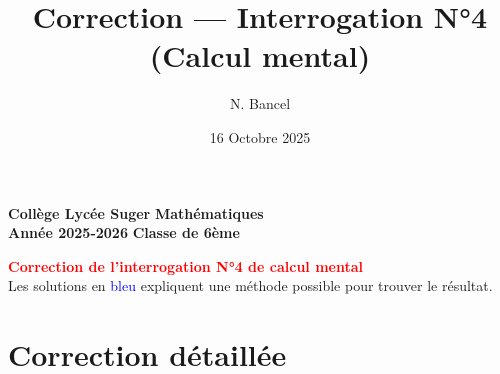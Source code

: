 \documentclass[answers]{exam}
\title{Correction --- Interrogation N°4 (Calcul mental)}
\author{N. Bancel}
\date{16 Octobre 2025}
\begin{document}
\textbf{Collège Lycée Suger}
\hfill
\textbf{Mathématiques} \\

\textbf{Année 2025-2026}
\hfill
\textbf{Classe de 6ème} \par

{\let\newpage\relax\maketitle}

\begin{center}
  \textbf{\textcolor{red}{Correction de l'interrogation N°4 de calcul mental}} \\
  Les solutions en \textcolor{blue}{bleu} expliquent une méthode possible pour trouver le résultat.
\end{center}

\section*{Correction détaillée}
\end{document}
